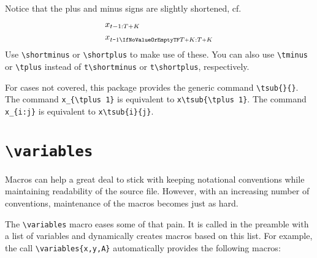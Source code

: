 \documentclass
[
twoside, %
]
{article}
\begin{document}
Notice that the plus and minus signs are slightly shortened, cf.
\begin{align*}
	&x_{t-1:T+K}\\
	&x\tsub{t\shortminus1}{T\shortplus K}
\end{align*}
Use \texttt{\textbackslash shortminus} or \texttt{\textbackslash shortplus} to make use of these.
You can also use \texttt{\textbackslash tminus} or \texttt{\textbackslash tplus} instead of \texttt{t\textbackslash shortminus} or \texttt{t\textbackslash shortplus}, respectively.

For cases not covered, this package provides the generic command \texttt{\textbackslash tsub\{\}\{\}}.
The command \texttt{x\_\{\textbackslash tplus 1\}} is equivalent to \texttt{x\textbackslash tsub\{\textbackslash tplus 1\}}.
The command \texttt{x\_\{i:j\}} is equivalent to \texttt{x\textbackslash tsub\{i\}\{j\}}.


\section{\texttt{\textbackslash variables}}
Macros can help a great deal to stick with keeping notational conventions while maintaining readability of the source file. However, with an increasing number of conventions, maintenance of the macros becomes just as hard.

The \texttt{\textbackslash variables} macro eases some of that pain. It is called in the preamble with a list of variables and dynamically creates macros based on this list. For example, the call \texttt{\textbackslash variables\{x,y,A\}} automatically provides the following macros:
\end{document}

